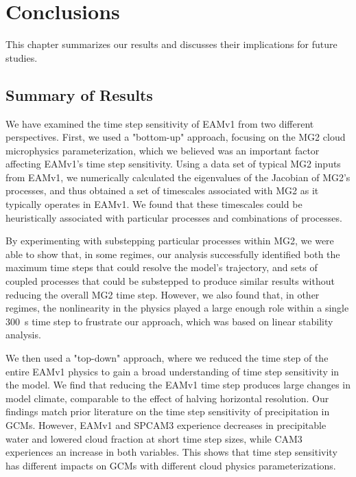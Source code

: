 \documentclass [11pt, proquest] {uwthesis}[2020/02/24]
\begin{document}
\chapter{Conclusions} \label{ch:conclusions}

This chapter summarizes our results and discusses their implications for future studies.

\section{Summary of Results} \label{sec:summary}

We have examined the time step sensitivity of EAMv1 from two different perspectives. First, we used a "bottom-up" approach, focusing on the MG2 cloud microphysics parameterization, which we believed was an important factor affecting EAMv1's time step sensitivity. Using a data set of typical MG2 inputs from EAMv1, we numerically calculated the eigenvalues of the Jacobian of MG2's processes, and thus obtained a set of timescales associated with MG2 as it typically operates in EAMv1. We found that these timescales could be heuristically associated with particular processes and combinations of processes.

By experimenting with substepping particular processes within MG2, we were able to show that, in some regimes, our analysis successfully identified both the maximum time steps that could resolve the model's trajectory, and sets of coupled processes that could be substepped to produce similar results without reducing the overall MG2 time step. However, we also found that, in other regimes, the nonlinearity in the physics played a large enough role within a single \SI{300}{\second} time step to frustrate our approach, which was based on linear stability analysis.

We then used a "top-down" approach, where we reduced the time step of the entire EAMv1 physics to gain a broad understanding of time step sensitivity in the model. We find that reducing the EAMv1 time step produces large changes in model climate, comparable to the effect of halving horizontal resolution. Our findings match prior literature on the time step sensitivity of precipitation in GCMs. However, EAMv1 and SPCAM3 experience decreases in precipitable water and lowered cloud fraction at short time step sizes, while CAM3 experiences an increase in both variables. This shows that time step sensitivity has different impacts on GCMs with different cloud physics parameterizations.
\end{document}
